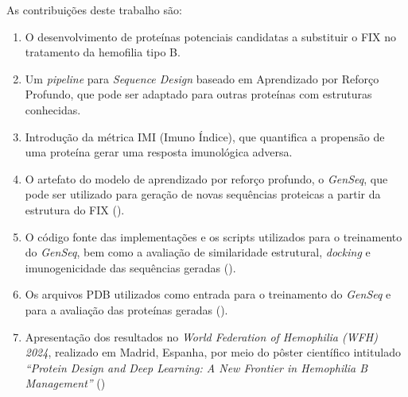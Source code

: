 As contribuições deste trabalho são:
\begin{enumerate}
  \item O desenvolvimento de proteínas potenciais candidatas a substituir o FIX no tratamento da hemofilia tipo B.
  \item Um \textit{pipeline} para \textit{Sequence Design} baseado em Aprendizado por Reforço Profundo, que pode ser adaptado para outras proteínas com estruturas conhecidas.
  \item Introdução da métrica IMI (Imuno Índice), que quantifica a propensão de uma proteína gerar uma resposta imunológica adversa.
  \item O artefato do modelo de aprendizado por reforço profundo, o \textit{GenSeq}, que pode ser utilizado para geração de novas sequências proteicas a partir da estrutura do FIX (\cite{repo}).
  \item O código fonte das implementações e os scripts utilizados para o treinamento do \textit{GenSeq}, bem como a avaliação 
  de similaridade estrutural, \textit{docking} e imunogenicidade das sequências geradas (\cite{repo}).
  \item Os arquivos PDB utilizados como entrada para o treinamento do \textit{GenSeq} e para a avaliação das proteínas geradas (\cite{repo}).
  \item Apresentação dos resultados no \textit{World Federation of Hemophilia (WFH) 2024}, realizado em Madrid, Espanha, por meio do pôster científico intitulado \textit{“Protein Design and Deep Learning: A New Frontier in Hemophilia B Management”} (\cite{WFH2024})
\end{enumerate}
